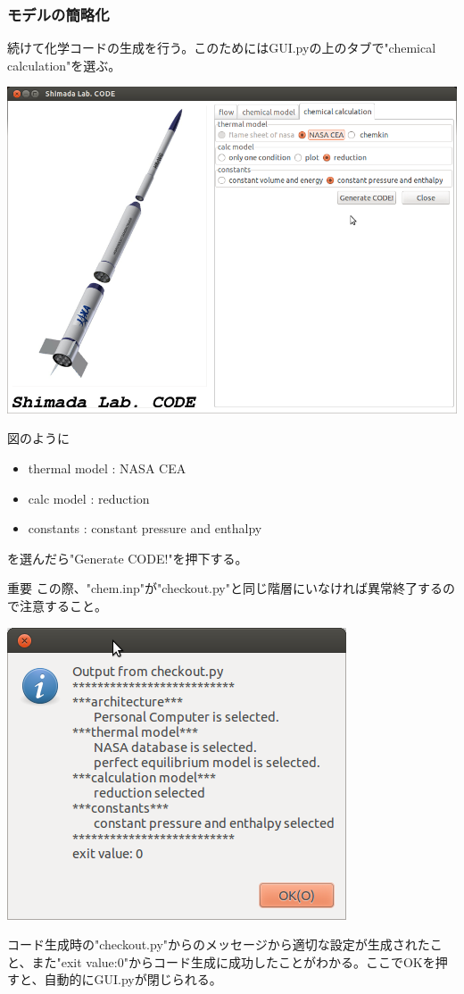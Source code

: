 \documentclass{jsarticle}
\begin{document}
\subsubsection{モデルの簡略化}
続けて化学コードの生成を行う。このためにはGUI.pyの上のタブで"chemical calculation"を選ぶ。
\begin{center}
\includegraphics[width=.7\textwidth,bb=0 0 895 649]{tutorial_img/050.png}
\end{center}
図のように
\begin{itemize}
\item thermal model : NASA CEA
\item calc model : reduction
\item constants : constant pressure and enthalpy
\end{itemize}
を選んだら"Generate CODE!"を押下する。
\begin{itembox}[l]{重要}
この際、"chem.inp"が"checkout.py"と同じ階層にいなければ異常終了するので注意すること。
\end{itembox}
\begin{center}
\includegraphics[width=.4\textwidth,bb=0 0 380 327]{tutorial_img/060.png}
\end{center}
コード生成時の"checkout.py"からのメッセージから適切な設定が生成されたこと、また"exit value:0"からコード生成に成功したことがわかる。ここでOKを押すと、自動的にGUI.pyが閉じられる。
\end{document}
